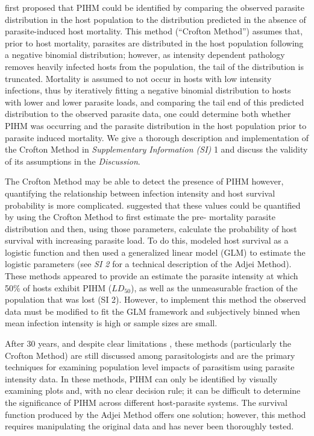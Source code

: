 \documentclass[12pt, a4paper]{article}
\begin{document}
\cite{Crofton1971a} first proposed that PIHM could be identified by comparing the
observed parasite distribution in the host population to the distribution
predicted in the absence of parasite-induced host mortality. This method
(“Crofton Method”) assumes that, prior to host mortality, parasites are
distributed in the host population following a negative binomial distribution;
however, as intensity dependent pathology removes heavily infected hosts from
the population, the tail of the distribution is truncated. Mortality is assumed
to not occur in hosts with low intensity infections, thus by iteratively
fitting a negative binomial distribution to hosts with lower and lower parasite
loads, and comparing the tail end of this predicted distribution to the
observed parasite data, one could determine both whether PIHM was occurring and
the parasite distribution in the host population prior to parasite induced
mortality. We give a thorough description and implementation of the Crofton
Method in \emph{Supplementary Information (SI)} 1 and discuss the validity of
its assumptions in the \emph{Discussion}.

The Crofton Method may be able to detect the presence of PIHM however,
quantifying the relationship between infection intensity and host survival
probability is more complicated. \cite{Adjei1986} suggested that these values
could be quantified by using the Crofton Method to first estimate the pre-
mortality parasite distribution and then, using those parameters, calculate the
probability of host survival with increasing parasite load. To do this,
\cite{Adjei1986} modeled host survival as a logistic function and then used a generalized linear model (GLM) to estimate the logistic parameters (see \emph{SI 2} for a technical description of the Adjei Method).
These methods appeared to provide an estimate the parasite intensity at which
50\% of hosts exhibit PIHM ($LD_{50}$), as well as the unmeasurable fraction of the
population that was lost (SI 2). However, to implement this method the observed data must be
modified to fit the GLM framework and subjectively binned when mean
infection intensity is high or sample sizes are small.

After 30 years, and despite clear limitations \citep{McCallum2000a}, these
methods (particularly the Crofton Method) are still discussed among
parasitologists and are the primary techniques for examining population level
impacts of parasitism using parasite intensity data. In these methods, PIHM can
only be identified by visually examining plots and, with no clear decision
rule; it can be difficult to determine the significance of PIHM across
different host-parasite systems. The survival function produced by the Adjei
Method offers one solution; however, this method requires manipulating the
original data and has never been thoroughly tested.
\end{document}
